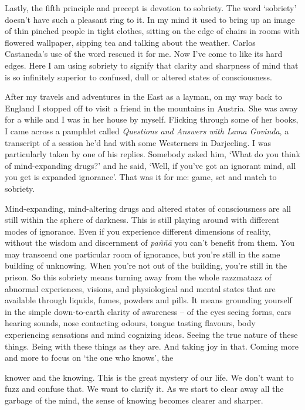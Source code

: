 Lastly, the fifth principle and precept is devotion to sobriety. The
word `sobriety' doesn't have such a pleasant ring to it. In my mind it
used to bring up an image of thin pinched people in tight clothes,
sitting on the edge of chairs in rooms with flowered wallpaper, sipping
tea and talking about the weather. Carlos Castaneda's use of the word
rescued it for me. Now I've come to like its hard edges. Here I am using
sobriety to signify that clarity and sharpness of mind that is so
infinitely superior to confused, dull or altered states of
consciousness.

After my travels and adventures in the East as a layman, on my way back
to England I stopped off to visit a friend in the mountains in Austria.
She was away for a while and I was in her house by myself. Flicking
through some of her books, I came across a pamphlet called
\emph{Questions and Answers with Lama Govinda}, a transcript of a
session he'd had with some Westerners in Darjeeling. I was particularly
taken by one of his replies. Somebody asked him, `What do you think of
mind-expanding drugs?' and he said, `Well, if you've got an ignorant
mind, all you get is expanded ignorance'. That was it for me: game, set
and match to sobriety.

Mind-expanding, mind-altering drugs and altered states of consciousness
are all still within the sphere of darkness. This is still playing
around with different modes of ignorance. Even if you experience
different dimensions of reality, without the wisdom and discernment of
\emph{paññā} you can't benefit from them. You may transcend one
particular room of ignorance, but you're still in the same building of
unknowing. When you're not out of the building, you're still in the
prison. So this sobriety means turning away from the whole razzmatazz of
abnormal experiences, visions, and physiological and mental states that
are available through liquids, fumes, powders and pills. It means
grounding yourself in the simple down-to-earth clarity of awareness --
of the eyes seeing forms, ears hearing sounds, nose contacting odours,
tongue tasting flavours, body experiencing sensations and mind cognizing
ideas. Seeing the true nature of these things. Being with these things
as they are. And taking joy in that. Coming more and more to focus on
`the one who knows', the

knower and the knowing. This is the great mystery of our life. We don't
want to fuzz and confuse that. We want to clarify it. As we start to
clear away all the garbage of the mind, the sense of knowing becomes
clearer and sharper.

